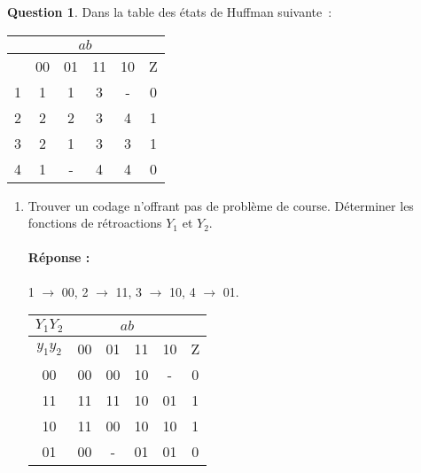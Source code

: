 \documentclass[11pt,a4paper]{article}
\theoremstyle{definition}%
\newtheorem{Q}{Question}[] %
\newcommand{\reponse}[1]{%
	\ifthenelse {\boolean{corrige}} {\paragraph{Réponse :} \color{darkblue}   #1\color{black}} {}
 }
\begin{document}





\begin{Q}
Dans la table des états de Huffman suivante~:
\begin{center}
	\begin{tabular}{|c|c|c|c|c|c|}\hline
	& \multicolumn{4}{c|}{$ab$} & \\ \hline
	  & 00 & 01 & 11 & 10 & Z \\ \hline
	1 & 1 & 1 & 3 & - & 0 \\ \hline
	2 & 2 & 2 & 3 & 4 & 1 \\ \hline
	3 & 2 & 1 & 3 & 3 & 1 \\ \hline
	4 & 1 & - & 4 & 4 & 0 \\ \hline
	\end{tabular}
\end{center}
\begin{enumerate}
	\item Trouver un codage n'offrant pas de problème de course.
	Déterminer les fonctions de rétroactions $Y_1$ et $Y_2$.
	\reponse{
		1 $\rightarrow$ 00, 2 $\rightarrow$ 11, 3 $\rightarrow$ 10, 4 $\rightarrow$ 01.
		\begin{center}
			\begin{tabular}{|c|c|c|c|c|c|}\hline
			$Y_1Y_2$ & \multicolumn{4}{c|}{$ab$} & \\ \hline
			$y_1y_2$ & 00 & 01 & 11 & 10 & Z \\ \hline
			00       & 00 & 00 & 10 & -  & 0 \\ \hline
			11       & 11 & 11 & 10 & 01 & 1 \\ \hline
			10       & 11 & 00 & 10 & 10 & 1 \\ \hline
			01       & 00 & -  & 01 & 01 & 0 \\ \hline
			\end{tabular}
		\end{center}

}
\end{enumerate}
\end{Q}
\end{document}
